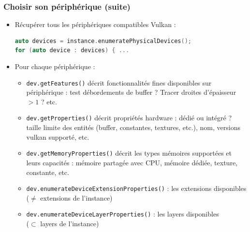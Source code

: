 \documentclass{beamer}
\begin{document}
\begin{frame}[fragile]
    \frametitle{Choisir son périphérique (suite)}


\begin{itemize}
\item Récupérer tous les périphériques compatibles Vulkan :
\lstset{style=customcpp}
\begin{lstlisting}[language=C++]
auto devices = instance.enumeratePhysicalDevices();
for (auto device : devices) { ...
\end{lstlisting}
\item Pour chaque périphérique :
\begin{itemize}
\item \textcolor{NavyBlue}{\lstinline|dev.getFeatures()|}  décrit 
fonctionnalités fines disponibles sur périphérique :
test débordements de buffer ? Tracer droites d'épaisseur $>1$ ? etc.
\item \textcolor{NavyBlue}{\lstinline|dev.getProperties()|} décrit  propriétés hardware : dédié ou intégré ? taille limite
des entités (buffer, constantes, textures, etc.), nom, versions vulkan supporté, etc.
\item \textcolor{NavyBlue}{\lstinline|dev.getMemoryProperties()|} décrit les types mémoires supportées et leurs capacités :
mémoire partagée avec CPU, mémoire dédiée, texture, constante, etc.
\item \textcolor{NavyBlue}{\lstinline|dev.enumerateDeviceExtensionProperties()|} : les extensions
disponibles ($\neq$ extensions de l'instance)
\item \textcolor{NavyBlue}{\lstinline|dev.enumerateDeviceLayerProperties()|} : les layers
disponibles \\($\subset$ layers de l'instance)
\end{itemize}
\end{itemize}
\end{frame}
\end{document}
